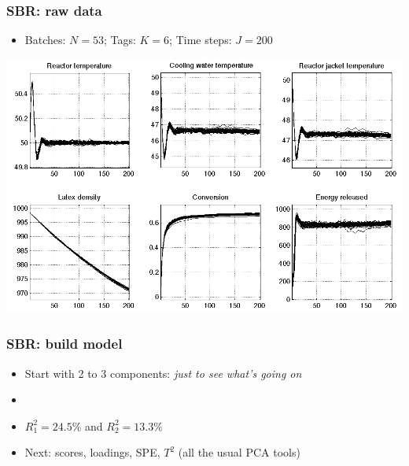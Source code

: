 \begin{frame}\frametitle{SBR: raw data}
	
	\begin{itemize}
		\item	Batches: \( N = 53 \); Tags: \( K = 6 \); Time steps: \( J = 200 \)
		
	\end{itemize}
	
	\begin{center}
		\includegraphics[width=\textwidth]{images/sbr/SBR-raw-data-trajectories.png}
	\end{center}
	{}
\end{frame}

\begin{frame}\frametitle{SBR: build model}
	
	\begin{itemize}
		\item	Start with 2 to 3 components: \emph{just to see what's going on}
		
		\item	{}
		
		\item	\( R^2_1 = 24.5\% \) and \( R^2_2 = 13.3\% \)
		
		\item	Next: scores, loadings, SPE, \( T^2 \) (all the usual PCA tools)
		
	\end{itemize}

\end{frame}

